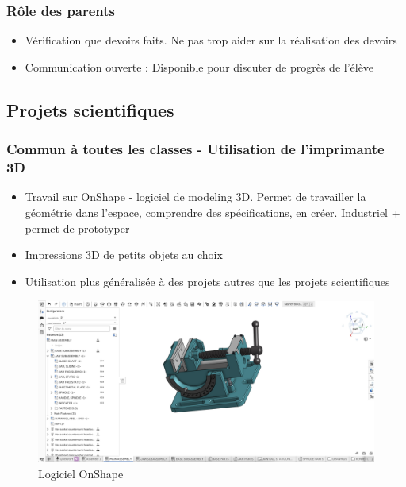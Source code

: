 \documentclass[a4paper,12pt]{article}
\begin{document}
\subsubsection*{Rôle des parents} 

\begin{itemize}[noitemsep]
  \item Vérification que devoirs faits. Ne pas trop aider sur la réalisation des devoirs
  \item Communication ouverte : Disponible pour discuter de progrès de l'élève 
\end{itemize}


\subsection*{Projets scientifiques}


\subsubsection*{Commun à toutes les classes - Utilisation de l'imprimante 3D}

\begin{itemize}[noitemsep]
  \item Travail sur OnShape - logiciel de modeling 3D. Permet de travailler la géométrie dans l'espace, comprendre des spécifications, en créer. Industriel + permet de prototyper
  \item Impressions 3D de petits objets au choix
  \item Utilisation plus généralisée à des projets autres que les projets scientifiques
\end{itemize}

\begin{figure}[H]
  \centering
  \includegraphics[width=\linewidth]{onshape.jpg}
  \caption{\label{} Logiciel OnShape}
\end{figure}
\end{document}
